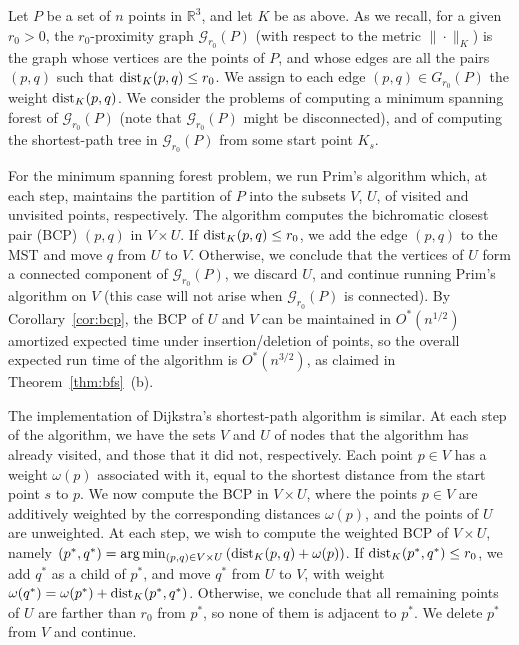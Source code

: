 \documentclass[11pt]{article}
\def\reals{{\mathbb R}}
\def\dist{{\rm dist}}
\def\G{\mathcal{G}}
\def\K{\mathcal{K}}
\theoremstyle{definition}
\begin{document}
Let $P$ be a set of $n$ points in $\reals^3$, and let $K$ be as above. As we recall,
for a given $r_0>0$, 
the $r_0$-proximity graph $\G_{r_0}(P)$ (with respect to the metric $\|\cdot\|_K$) 
is the graph whose vertices are the points of $P$, and whose
edges are all the pairs $(p,q)$ such that $\dist_K(p,q) \le r_0$. 
We assign to each edge $(p,q)\in G_{r_0}(P)$ the weight $\dist_K(p,q)$. We consider the problems 
of computing a minimum spanning forest of $\G_{r_0}(P)$ (note that $\G_{r_0}(P)$ might be disconnected), 
and of computing the shortest-path tree in $\G_{r_0}(P)$ from some start point $K_s$.

For the minimum spanning forest problem, 
we run Prim's algorithm which, at each step, maintains the partition of $P$
into the subsets $V$, $U$, of visited and unvisited points, respectively. The algorithm computes
the bichromatic closest pair (BCP) $(p,q)$ in $V\times U$. If $\dist_K(p,q) \le r_0$, 
we add the edge $(p,q)$ to the MST and move $q$ from $U$ to $V$. Otherwise, we
conclude that the vertices of $U$ form a connected component of $\G_{r_0} (P)$, we discard $U$, 
and continue running Prim's algorithm on $V$ (this case will not arise when $\G_{r_0}(P)$ 
is connected). By Corollary~\ref{cor:bcp}, the BCP of $U$ and $V$ can be maintained in $O^*(n^{1/2})$ 
amortized expected time under insertion/deletion of points, so the overall expected run time 
of the algorithm is $O^*(n^{3/2})$, as claimed in Theorem~\ref{thm:bfs}~(b).


The implementation of Dijkstra's shortest-path algorithm is similar.
At each step of the algorithm, we have the sets $V$ and $U$ of nodes that the algorithm has already visited, and
those that it did not, respectively. Each point $p\in V$ has a weight $\omega(p)$ associated with it, equal to
the shortest distance from the start point $s$ to $p$. We now compute the BCP in $V\times U$, where the
points $p\in V$ are additively weighted by the corresponding distances $\omega(p)$, and the points
of $U$ are unweighted. At each step, we wish to compute the weighted BCP of $V \times U$,
namely $(p^*,q^*) = \arg\min_{(p,q)\in V\times U} \left( \dist_K(p,q)+\omega(p) \right)$. 
If $\dist_K(p^*,q^*) \le r_0$, 
we add $q^*$ as a child of $p^*$, and move $q^*$ from $U$ to $V$, with weight
$\omega(q^*) = \omega(p^*) + \dist_K(p^*,q^*)$. Otherwise, we conclude that all remaining 
points of $U$ are farther than $r_0$ from $p^*$, so none of them is adjacent to $p^*$.
We delete $p^*$ from $V$ and continue.
\end{document}

